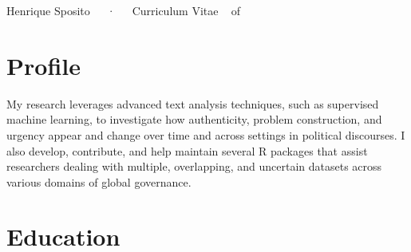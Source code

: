 \documentclass[11pt,a4paper,]{awesome-cv}
\begin{document}
\makecvheader

\makecvfooter
  {}
    {Henrique Sposito~~~·~~~Curriculum Vitae}
  {\thepage~ of \pageref{LastPage}~}





\hypertarget{profile}{%
\section{Profile}\label{profile}}

My research leverages advanced text analysis techniques, such as
supervised machine learning, to investigate how authenticity, problem
construction, and urgency appear and change over time and across
settings in political discourses. I also develop, contribute, and help
maintain several R packages that assist researchers dealing with
multiple, overlapping, and uncertain datasets across various domains of
global governance.

\hypertarget{education}{%
\section{Education}\label{education}}
\end{document}
